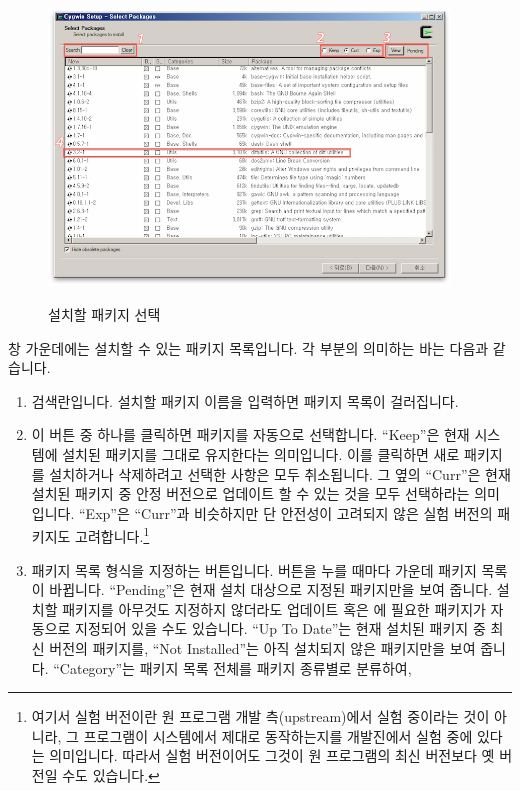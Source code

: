\begin{itemize}
\begin{figure}[t]
    \includegraphics[width=0.95\textwidth]{img/cygwin.png}
    \label{fig:cygwin}
    \caption{설치할 \CYGWIN{} 패키지 선택}
  \end{figure}
  창 가운데에는 설치할 수 있는 \CYGWIN{} 패키지 목록입니다. 각 부분의 의미하는
  바는 다음과 같습니다.
  \begin{enumerate}
  \item 검색란입니다. 설치할 패키지 이름을 입력하면 패키지 목록이 걸러집니다.
  \item 이 버튼 중 하나를 클릭하면 패키지를 자동으로 선택합니다. ``Keep''은
    현재 \CYGWIN{} 시스템에 설치된 패키지를 그대로 유지한다는 의미입니다. 이를
    클릭하면 새로 패키지를 설치하거나 삭제하려고 선택한 사항은 모두
    취소됩니다. 그 옆의 ``Curr''은 현재 설치된 패키지 중 안정 버전으로 업데이트
    할 수 있는 것을 모두 선택하라는 의미입니다. ``Exp''은 ``Curr''과 비슷하지만
    단 안전성이 고려되지 않은 실험 버전의 패키지도 고려합니다.\footnote{여기서
      실험 버전이란 원 프로그램 개발 측(upstream)에서 실험 중이라는 것이
      아니라, 그 프로그램이 \CYGWIN{} 시스템에서 제대로 동작하는지를 \CYGWIN{}
      개발진에서 실험 중에 있다는 의미입니다. 따라서 실험 버전이어도 그것이 원
      프로그램의 최신 버전보다 옛 버전일 수도 있습니다.}
  \item 패키지 목록 형식을 지정하는 버튼입니다. 버튼을 누를 때마다
    가운데 패키지 목록이 바뀝니다. ``Pending''은 현재 설치 대상으로 지정된
    패키지만을 보여 줍니다. 설치할 패키지를 아무것도 지정하지 않더라도
    업데이트 혹은 \CYGWIN{}에 필요한 패키지가 자동으로 지정되어 있을 수도
    있습니다. ``Up To Date''는 현재 설치된 패키지 중 최신 버전의 패키지를,
    ``Not Installed''는 아직 설치되지 않은 패키지만을 보여
    줍니다. ``Category''는 패키지 목록 전체를 패키지 종류별로 분류하여,

\end{enumerate}
\end{itemize}
